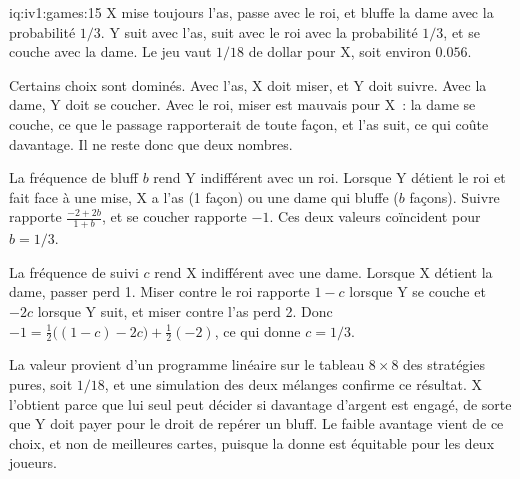 \begin{solution}{iq:iv1:games:15}
X mise toujours l'as, passe avec le roi, et bluffe la dame avec la probabilité $1/3$. Y suit avec l'as, suit avec le roi avec la probabilité $1/3$, et se couche avec la dame. Le jeu vaut $1/18$ de dollar pour X, soit environ $0.056$.

Certains choix sont dominés. Avec l'as, X doit miser, et Y doit suivre. Avec la dame, Y doit se coucher. Avec le roi, miser est mauvais pour X~: la dame se couche, ce que le passage rapporterait de toute façon, et l'as suit, ce qui coûte davantage. Il ne reste donc que deux nombres.

La fréquence de bluff $b$ rend Y indifférent avec un roi. Lorsque Y détient le roi et fait face à une mise, X a l'as (1 façon) ou une dame qui bluffe ($b$ façons). Suivre rapporte $\frac{-2 + 2b}{1 + b}$, et se coucher rapporte $-1$. Ces deux valeurs coïncident pour $b = 1/3$.

La fréquence de suivi $c$ rend X indifférent avec une dame. Lorsque X détient la dame, passer perd 1. Miser contre le roi rapporte $1 - c$ lorsque Y se couche et $-2c$ lorsque Y suit, et miser contre l'as perd 2. Donc $-1 = \tfrac12\bigl((1 - c) - 2c\bigr) + \tfrac12(-2)$, ce qui donne $c = 1/3$.

La valeur provient d'un programme linéaire sur le tableau $8 \times 8$ des stratégies pures, soit $1/18$, et une simulation des deux mélanges confirme ce résultat. X l'obtient parce que lui seul peut décider si davantage d'argent est engagé, de sorte que Y doit payer pour le droit de repérer un bluff. Le faible avantage vient de ce choix, et non de meilleures cartes, puisque la donne est équitable pour les deux joueurs.

\end{solution}


